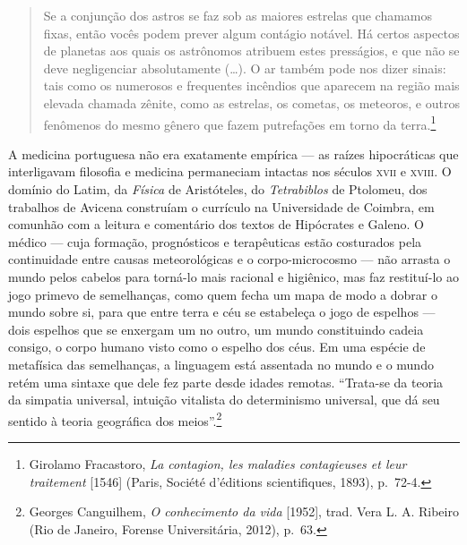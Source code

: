 \begin{quote}
Se a conjunção dos astros se faz sob as maiores estrelas que chamamos
fixas, então vocês podem prever algum contágio notável. Há certos
aspectos de planetas aos quais os astrônomos atribuem estes presságios,
e que não se deve negligenciar absolutamente (\dots{}). O ar também pode nos
dizer sinais: tais como os numerosos e frequentes incêndios que aparecem
na região mais elevada chamada zênite, como as estrelas, os cometas, os
meteoros, e outros fenômenos do mesmo gênero que fazem putrefações em
torno da terra.\footnote{Girolamo Fracastoro, \textit{La contagion, les
  maladies contagieuses et leur traitement} {[}1546{]} (Paris, Société
  d'éditions scientifiques, 1893), p.~72-4.}
\end{quote}

A medicina portuguesa não era exatamente empírica --- as raízes
hipocráticas que interligavam filosofia e medicina permaneciam intactas
nos séculos \textsc{xvii} e \textsc{xviii}. O domínio do Latim, da \textit{Física} de
Aristóteles, do \textit{Tetrabiblos} de Ptolomeu, dos trabalhos de Avicena
construíam o currículo na Universidade de Coimbra, em comunhão com a
leitura e comentário dos textos de Hipócrates e Galeno. O médico --- cuja
formação, prognósticos e terapêuticas estão costurados pela continuidade
entre causas meteorológicas e o corpo-microcosmo --- não arrasta o mundo
pelos cabelos para torná-lo mais racional e higiênico, mas faz
restituí-lo ao jogo primevo de semelhanças, como quem fecha um mapa de
modo a dobrar o mundo sobre si, para que entre terra e céu se estabeleça
o jogo de espelhos --- dois espelhos que se enxergam um no outro, um
mundo constituindo cadeia consigo, o corpo humano visto como o espelho
dos céus. Em uma espécie de metafísica das semelhanças, a linguagem está
assentada no mundo e o mundo retém uma sintaxe que dele fez parte desde
idades remotas. ``Trata-se da teoria da simpatia universal, intuição
vitalista do determinismo universal, que dá seu sentido à teoria
geográfica dos meios''.\footnote{Georges Canguilhem, \textit{O
  conhecimento da vida} {[}1952{]}, trad. Vera L. A. Ribeiro (Rio de
  Janeiro, Forense Universitária, 2012), p.~63.}

